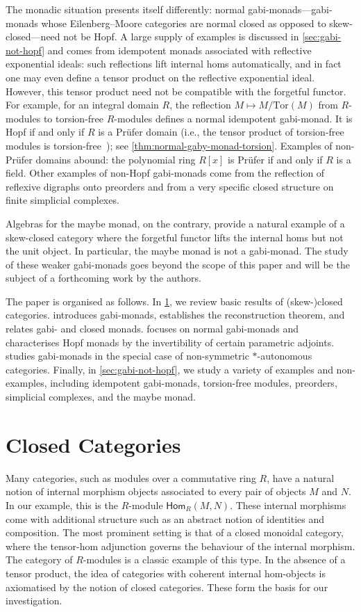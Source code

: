 \documentclass[12pt,dvipsnames,oneside]{amsart}
\theoremstyle{plain}
\theoremstyle{remark}
\theoremstyle{definition}
\newcommand{\Tor}{\ensuremath{\mathrm{Tor}}}
\newcommand*{\Hom}{\mathsf{Hom}}
\begin{document}
The monadic situation presents itself differently: normal gabi-monads---gabi-monads whose Eilenberg--Moore categories are normal closed as opposed to skew-closed---need not be Hopf.
A large supply of examples is discussed in \cref{sec:gabi-not-hopf} and comes from idempotent monads associated with reflective exponential ideals: such reflections lift internal homs automatically, and in fact one may even define a tensor product on the reflective exponential ideal.
However, this tensor product need not be compatible with the forgetful functor.
For example, for an integral domain \(R\), the reflection \(M \mapsto M/\Tor(M)\) from \(R\)-modules to torsion-free \(R\)-modules defines a normal idempotent gabi-monad. It is Hopf if and only if \(R\) is a Pr\"ufer domain (i.e., the tensor product of torsion-free modules is torsion-free~\cite[Theorem~4.2]{chase61:direc});
see \cref{thm:normal-gaby-monad-torsion}.
Examples of non-Pr\"ufer domains abound: the polynomial ring \(R[x]\) is Pr\"ufer if and only if \(R\) is a field.
Other examples of non-Hopf gabi-monads come from the reflection of reflexive digraphs onto preorders and from a very specific closed structure on finite simplicial complexes.

Algebras for the maybe monad, on the contrary, provide a natural example of a skew-closed category where the forgetful functor lifts the internal homs but not the unit object.
In particular, the maybe monad is not a gabi-monad.
The study of these weaker gabi-monads goes beyond the scope of this paper and will be the subject of a forthcoming work by the authors.

\medskip
The paper is organised as follows.
In \cref{sec:closec-cats}, we review basic results of (skew-)closed categories.
 introduces gabi-monads, establishes the reconstruction theorem, and relates gabi- and closed monads.
 focuses on normal gabi-monads and characterises Hopf monads by the invertibility of certain parametric adjoints.
 studies gabi-monads in the special case of non-symmetric \(*\)-autonomous categories.
Finally, in \cref{sec:gabi-not-hopf}, we study a variety of examples and non-examples, including idempotent gabi-monads, torsion-free modules, preorders, simplicial complexes, and the maybe monad.

\section{Closed Categories}\label{sec:closec-cats}
Many categories, such as modules over a commutative ring \(R\), have a natural notion of internal morphism objects associated to every pair of objects \(M\) and \(N\). In our example, this is the \(R\)-module \(\Hom_{R}(M,N)\).
These internal morphisms come with additional structure such as an abstract notion of identities and composition.
The most prominent setting is that of a closed monoidal category, where the tensor-hom adjunction governs the behaviour of the internal morphism.
The category of \(R\)-modules is a classic example of this type.
In the absence of a tensor product, the idea of categories with coherent internal hom-objects is axiomatised by the notion of closed categories.
These form the basis for our investigation.
\end{document}
